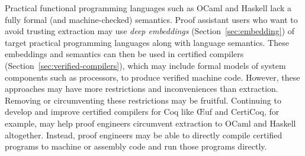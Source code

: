 Practical functional programming languages such as OCaml and Haskell lack a fully formal (and machine-checked) semantics. Proof assistant users who want to avoid trusting extraction may use \emph{deep embeddings} (Section~\ref{sec:embedding}) of target practical programming languages along with language semantics. These embeddings and semantics can then be used in certified compilers (Section~\ref{sec:verified-compilers}), which may include formal models of system components such as processors, to produce verified machine code. However, these approaches may have more restrictions and inconveniences than extraction.
Removing or circumventing these restrictions may be fruitful. Continuing to develop and improve certified compilers for Coq like \OE uf and 
CertiCoq, for example, may help proof engineers circumvent extraction to OCaml and Haskell altogether.
Instead, proof engineers may be able to directly compile certified programs to machine or assembly code and run those programs directly.

%



